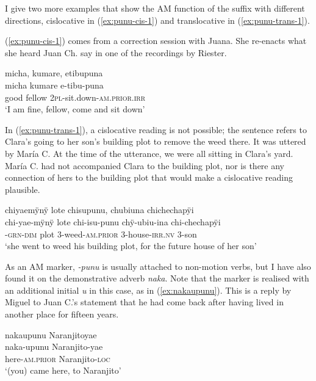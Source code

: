 I give two more examples that show the AM function of the suffix with different directions, cislocative in (\ref{ex:punu-cis-1}) and translocative in (\ref{ex:punu-trans-1}).

(\ref{ex:punu-cis-1}) comes from a correction session with Juana. She re-enacts what she heard Juan Ch. say in one of the recordings by Riester.

\ea\label{ex:punu-cis-1}
\begingl 
\glpreamble micha, kumare, etibupuna\\
\gla micha kumare e-tibu-puna\\ 
\glb good fellow 2\textsc{pl}-sit.down-\textsc{am.prior.irr}\\ 
\glft ‘I am fine, fellow, come and sit down’
\trailingcitation{[jxx-p120430l-2.039]}
\xe

In (\ref{ex:punu-trans-1}), a cislocative reading is not possible; the sentence refers to Clara’s going to her son's building plot to remove the weed there. It was uttered by María C. At the time of the utterance, we were all sitting in Clara’s yard. María C. had not accompanied Clara to the building plot, nor is there any connection of hers to the building plot that would make a cislocative reading plausible.

\ea\label{ex:punu-trans-1}
\begingl 
\glpreamble chiyaemÿnÿ lote chisupunu, chubiuna chichechapÿi\\
\gla chi-yae-mÿnÿ lote chi-isu-punu chÿ-ubiu-ina chi-chechapÿi\\ 
-\textsc{grn}-\textsc{dim} plot 3-weed-\textsc{am.prior} 3-house-\textsc{irr.nv} 3-son\\ 
\glft ‘she went to weed his building plot, for the future house of her son’
\trailingcitation{[cux-c120414ls-1.98-101]}
\xe

As an AM marker, \textit{-punu} is usually attached to non-motion verbs, but I have also found it on the demonstrative adverb \textit{naka}. Note that the marker is realised with an additional initial \textit{u} in this case, as in (\ref{ex:nakaupunu}). This is a reply by Miguel to Juan C.’s statement that he had come back after having lived in another place for fifteen years.

\ea\label{ex:nakaupunu}
\begingl 
\glpreamble nakaupunu Naranjitoyae\\
\gla naka-upunu Naranjito-yae\\ 
\glb here-\textsc{am.prior} Naranjito-\textsc{loc}\\ 
\glft ‘(you) came here, to Naranjito’
\trailingcitation{[mqx-p110826l.451]}
\xe

